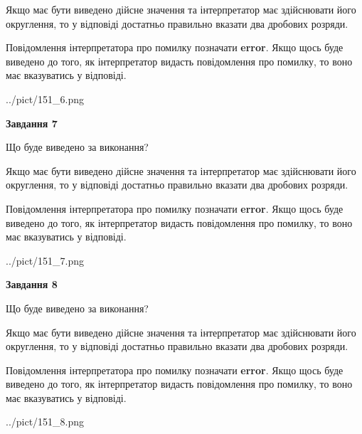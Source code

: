 \documentclass[12pt, ukrainian]{article}
\begin{document}
{\begin {Large}
Якщо має бути виведено дійсне значення та інтерпретатор має здійснювати його округлення, 
то у відповіді достатньо правильно вказати два дробових розряди.

Повідомлення інтерпретатора про помилку позначати \textbf{error}.
Якщо щось буде виведено до того, як інтерпретатор видасть повідомлення про помилку, 
то воно має вказуватись у відповіді. \par

\begin{center}
	{../pict/151_6.png}
\end{center}
\newpage

{\begin {center}\textbf{Завдання 7}\end {center}}\par
Що буде виведено за виконання? \par

Якщо має бути виведено дійсне значення та інтерпретатор має здійснювати його округлення, 
то у відповіді достатньо правильно вказати два дробових розряди.

Повідомлення інтерпретатора про помилку позначати \textbf{error}.
Якщо щось буде виведено до того, як інтерпретатор видасть повідомлення про помилку, 
то воно має вказуватись у відповіді. \par

\begin{center}
	{../pict/151_7.png}
\end{center}
\newpage

{\begin {center}\textbf{Завдання 8}\end {center}}\par
Що буде виведено за виконання? \par

Якщо має бути виведено дійсне значення та інтерпретатор має здійснювати його округлення, 
то у відповіді достатньо правильно вказати два дробових розряди.

Повідомлення інтерпретатора про помилку позначати \textbf{error}.
Якщо щось буде виведено до того, як інтерпретатор видасть повідомлення про помилку, 
то воно має вказуватись у відповіді. \par

\begin{center}
	{../pict/151_8.png}
\end{center}
\newpage


\end{Large}}
\end{document}
